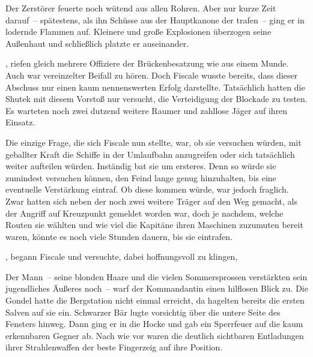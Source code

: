 \par

Der Zerstörer feuerte noch wütend aus allen Rohren. Aber nur kurze Zeit darauf~-- spätestens, als ihn Schüsse aus der Hauptkanone der  trafen~-- ging er in lodernde Flammen auf. Kleinere und große Explosionen überzogen seine Außenhaut und schließlich platzte er auseinander.

\par

, riefen gleich mehrere Offiziere der Brückenbesatzung wie aus einem Munde. Auch war vereinzelter Beifall zu hören. Doch Fiscale wusste bereits, dass dieser Abschuss nur einen kaum nennenswerten Erfolg darstellte. Tatsächlich hatten die Shutek mit diesem Vorstoß nur versucht, die Verteidigung der Blockade zu testen. Es warteten noch zwei dutzend weitere Raumer und zahllose Jäger auf ihren Einsatz.

\par

Die einzige Frage, die sich Fiscale nun stellte, war, ob sie versuchen würden, mit geballter Kraft die Schiffe in der Umlaufbahn anzugreifen oder sich tatsächlich weiter aufteilen würden. Inständig bat sie um ersteres. Denn so würde sie zumindest versuchen können, den Feind lange genug hinzuhalten, bis eine eventuelle Verstärkung eintraf. Ob diese kommen würde, war jedoch fraglich. Zwar hatten sich neben der  noch zwei weitere Träger auf den Weg gemacht, als der Angriff auf Kreuzpunkt gemeldet worden war, doch je nachdem, welche Routen sie wählten und wie viel die Kapitäne ihren Maschinen zuzumuten bereit waren, könnte es noch viele Stunden dauern, bis sie eintrafen.

\par

, begann Fiscale und versuchte, dabei hoffnungsvoll zu klingen, 

\par

Der Mann~-- seine blonden Haare und die vielen Sommersprossen verstärkten sein jugendliches Äußeres noch~-- warf der Kommandantin einen hilflosen Blick zu. 
\ortswechsel
Die Gondel hatte die Bergstation nicht einmal erreicht, da hagelten bereits die ersten Salven auf sie ein. Schwarzer Bär lugte vorsichtig über die untere Seite des Fensters hinweg. Dann ging er in die Hocke und gab ein Sperrfeuer auf die kaum erkennbaren Gegner ab. Nach wie vor waren die deutlich sichtbaren Entladungen ihrer Strahlenwaffen der beste Fingerzeig auf ihre Position.

